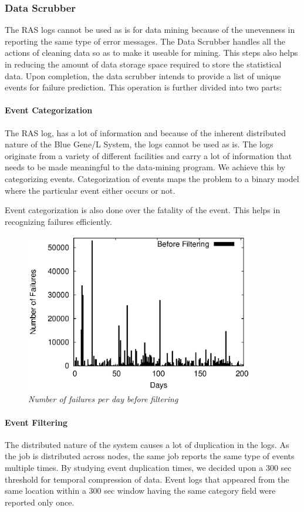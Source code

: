 \subsubsection{Data Scrubber}
The RAS logs cannot be used as is for data mining because of the unevenness in reporting the same type of error messages. The Data Scrubber handles all the actions of cleaning data so as to make it useable for mining. This steps also helps in reducing the amount of data storage space required to store the statistical data. Upon completion, the data scrubber intends to provide a list of unique events for failure prediction. This operation is further divided into two parts:
\paragraph{Event Categorization}
The RAS log, has a lot of information and because of the inherent distributed nature of the Blue Gene/L System, the logs cannot be used as is. The logs originate from a variety of different facilities and carry a lot of information that needs to be made meaningful to the data-mining program. We achieve this by categorizing events. Categorization of events maps the problem to a binary model where the particular event either occurs or not.

Event categorization is also done over the fatality of the event. This helps in recognizing failures efficiently.
\begin{figure}[t]
		\begin{center}
			\includegraphics[width=10cm,height=7cm]{figures/histogram_unfiltered.eps} 
			\caption{\small \sl Number of failures per day before filtering\label{fig:Label7}} 
		\end{center} 
	\end{figure}
\paragraph{Event Filtering}
The distributed nature of the system causes a lot of duplication in the logs.\cite{SCRUBBING_1}\cite{FAILURE_2} As the job is distributed across nodes, the same job reports the same type of events multiple times. By studying event duplication times, we decided upon a 300 sec threshold for temporal compression of data. Event logs that appeared from the same location within a 300 sec window having the same category field were reported only once.


